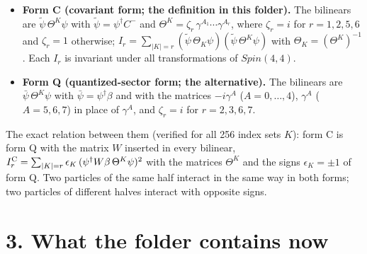 \documentclass[
  11pt,
]{article}
\providecommand{\tightlist}{%
  \setlength{\itemsep}{0pt}\setlength{\parskip}{0pt}}
\begin{document}
\begin{itemize}
\tightlist
\item
  \textbf{Form C (covariant form; the definition in this folder).} The
  bilinears are \(\tilde\psi\,\Theta^K\psi\) with
  \(\tilde\psi=\psi^\dagger C^-\) and
  \(\Theta^K=\zeta_r\,\gamma^{A_1}\cdots\gamma^{A_r}\), where
  \(\zeta_r=i\) for \(r=1,2,5,6\) and \(\zeta_r=1\) otherwise;
  \(I_r=\sum_{|K|=r}(\tilde\psi\,\Theta_K\psi)(\tilde\psi\,\Theta^K\psi)\)
  with \(\Theta_K=(\Theta^K)^{-1}\). Each \(I_r\) is invariant under all
  transformations of \(Spin(4,4)\).
\item
  \textbf{Form Q (quantized-sector form; the alternative).} The
  bilinears are \(\bar\psi\,\Theta^K\psi\) with
  \(\bar\psi=\psi^\dagger\beta\) and with the matrices \(-i\gamma^A\)
  (\(A=0,\dots,4\)), \(\gamma^A\) (\(A=5,6,7\)) in place of
  \(\gamma^A\), and \(\zeta_r=i\) for \(r=2,3,6,7\).
\end{itemize}

The exact relation between them (verified for all 256 index sets \(K\)):
form C is form Q with the matrix \(W\) inserted in every bilinear,
\(I_r^{\rm C}=\sum_{|K|=r}\epsilon_K\,(\psi^\dagger W\beta\,\Theta^K\psi)^2\)
with the matrices \(\Theta^K\) and the signs \(\epsilon_K=\pm1\) of form
Q. Two particles of the same half interact in the same way in both
forms; two particles of different halves interact with opposite signs.

\hypertarget{what-the-folder-contains-now}{%
\section{3. What the folder contains
now}\label{what-the-folder-contains-now}}
\end{document}
